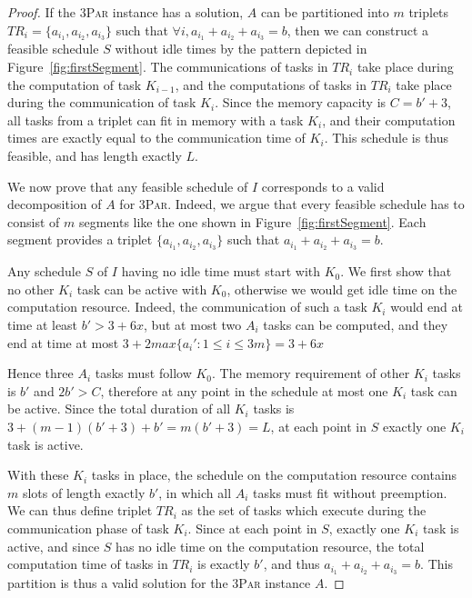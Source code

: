 \documentclass[sigconf]{acmart}
\newcommand{\threepart}{\textsc{3Par}\xspace}
\begin{document}
\begin{proof}
		
		If the \threepart instance has a solution, $A$ can be partitioned into
		$m$ triplets $TR_i = \{a_{i_1}, a_{i_2}, a_{i_3}\}$ such that $\forall
		i, a_{i_1} + a_{i_2} + a_{i_3} = b$, then we can construct a feasible
		schedule $S$ without idle times by the pattern depicted in
		Figure~\ref{fig:firstSegment}. The communications of tasks in $TR_i$ take
		place during the computation of task $K_{i-1}$, and the computations
		of tasks in $TR_i$ take place during the communication of task
		$K_i$. Since the memory capacity is $C=b'+3$, all tasks from a triplet
		can fit in memory with a task $K_i$, and their computation times are exactly
		equal to the communication time of $K_i$. This schedule is thus
		feasible, and has length exactly $L$.
		
		\medskip
		
		We now prove that any feasible schedule of $I$ corresponds to a valid
		decomposition of $A$ for \threepart. Indeed, we argue that every
		feasible schedule has to consist of $m$ segments like the one shown in
		Figure~\ref{fig:firstSegment}. Each segment provides a triplet
		$\{a_{i_1}, a_{i_2}, a_{i_3}\}$ such that $a_{i_1} + a_{i_2} + a_{i_3}
		= b$.
		
		Any schedule $S$ of $I$ having no idle time must start with $K_0$. We
		first show that no other $K_i$ task can be active with $K_0$,
		otherwise we would get idle time on the computation resource. Indeed, the
		communication of such a task $K_i$ would end at time at least $b'>3 +
		6x$, but at most two $A_i$ tasks can be computed, and they end at time
		at most $3+2max\{a_i':1\le i\le 3m\} = 3 + 6x$
		
		Hence three $A_i$ tasks must follow $K_0$. The memory requirement of
		other $K_i$ tasks is $b'$ and $2b'>C$, therefore at any point in the
		schedule at most one $K_i$ task can be active. Since the total
		duration of all $K_i$ tasks is $3 + (m-1)(b'+3) + b' = m (b'+3)=L$, at
		each point in $S$ exactly one $K_i$ task is active.
		
		With these $K_i$ tasks in place, the schedule on the computation
		resource contains $m$ slots of length exactly $b'$, in which all $A_i$
		tasks must fit without preemption. 
		 We can thus define triplet $TR_i$
		as the set of tasks which execute during the communication phase of
		task $K_i$. Since at each point in $S$, exactly one $K_i$ task is
		active, and since $S$ has no idle time on the computation resource,
		the total computation time of tasks in $TR_i$ is exactly $b'$, and thus
		$a_{i_1} + a_{i_2} + a_{i_3} = b$. This partition is thus a valid
		solution for the \threepart instance $A$. 
		

\end{proof}
\end{document}
